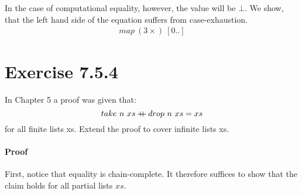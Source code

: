 \documentclass{article}[10pt]
\newcommand\concat{\ensuremath{\mathbin{+\mkern-8mu+}}}
\begin{document}
    In the case of computational equality, however, the value will be $\bot$. We show, that the left hand side of the
    equation suffers from case-exhaustion.
    \begin{align*}
      map\ (3 \times)\ [0 .. ]
    \end{align*}
  \section{Exercise 7.5.4}
    In Chapter 5 a proof was given that:
    \begin{equation*}
      take\ n\ xs \concat drop\ n\ xs = xs
    \end{equation*}
    for all finite lists xs. Extend the proof to cover infinite lists xs. 
    \paragraph{Proof} First, notice that equality is chain-complete. It therefore suffices
    to show that the claim holds for all partial lists $xs$.
\end{document}
